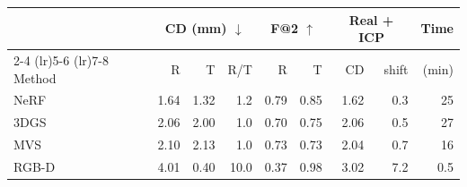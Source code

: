 \begin{tabular}{lrrrrrrrr}
\toprule
& \multicolumn{3}{c}{CD (mm) $\downarrow$} & \multicolumn{2}{c}{F@2 $\uparrow$} & \multicolumn{2}{c}{Real + ICP} & Time \\
\cmidrule(lr){2-4} \cmidrule(lr){5-6} \cmidrule(lr){7-8}
Method & R & T & R/T & R & T & CD & shift & (min) \\
\midrule
NeRF & 1.64 & 1.32 & 1.2 & 0.79 & 0.85 & 1.62 & 0.3 & 25 \\
3DGS & 2.06 & 2.00 & 1.0 & 0.70 & 0.75 & 2.06 & 0.5 & 27 \\
MVS & 2.10 & 2.13 & 1.0 & 0.73 & 0.73 & 2.04 & 0.7 & 16 \\
RGB-D & 4.01 & 0.40 & 10.0 & 0.37 & 0.98 & 3.02 & 7.2 & 0.5 \\
\bottomrule
\end{tabular}
